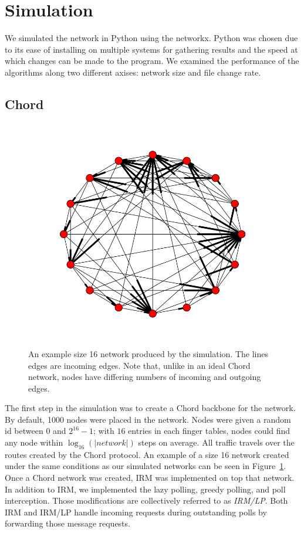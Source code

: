 \documentclass[10pt, conference, compsocconf, letterpaper]{IEEEtran} %
\begin{document}
\section{Simulation}



We simulated the network in Python using the networkx\cite{hagberg-2008-exploring}.  Python was chosen due to its ease of installing on multiple systems for gathering results and the speed at which changes can be made to the program.    We examined the performance of the algorithms along two different axises:  network size and file change rate.

\subsection{Chord}


\begin{figure}
\includegraphics[width=\linewidth]{chordreal}
\caption{An example size 16 network produced by the simulation.  The lines edges are incoming edges.  Note that, unlike in an ideal Chord network, nodes have differing numbers of incoming and outgoing edges.}
\label{chordreal}
\end{figure}



The first step in the simulation was to create a Chord backbone for the network. By default, 1000 nodes were placed in the network. Nodes were given a random id between 0 and $2^{16}-1$;  with $16$ entries in each finger tables, nodes could find any node within $\log_{16}(|network|)$ steps on average.  All traffic travels over the routes created by the Chord protocol. An example of a size 16 network created under the same conditions as our simulated networks can be seen in Figure~\ref{chordreal}.  Once a Chord network was created, IRM was implemented on top that network.   In addition to IRM, we implemented the lazy polling, greedy polling, and poll interception.  Those modifications are collectively referred to as \emph{IRM/LP}.  Both IRM and IRM/LP handle incoming requests during outstanding polls by forwarding those message requests.
\end{document}
